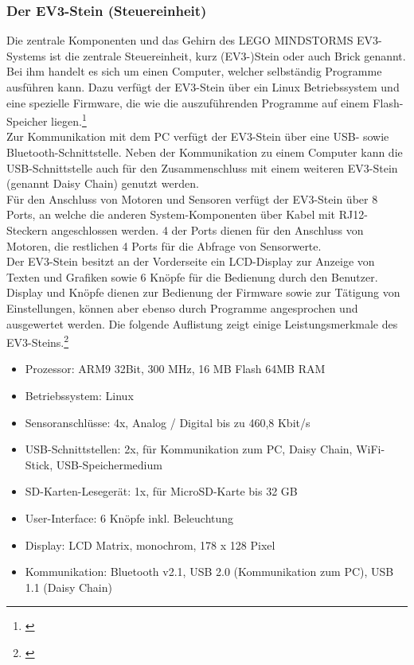 \subsubsection{Der EV3-Stein (Steuereinheit)}
\color{finishing}
Die zentrale Komponenten und das Gehirn des LEGO MINDSTORMS EV3-Systems ist die zentrale Steuereinheit, kurz (EV3-)Stein oder auch Brick genannt. Bei ihm handelt es sich um einen Computer, welcher selbständig Programme ausführen kann. Dazu verfügt der EV3-Stein über ein Linux Betriebssystem und eine spezielle Firmware, die wie die auszuführenden Programme auf einem Flash-Speicher liegen.\footnote{\citep[vgl.][Das EV3 Roboter Universum, Seite 21]{Scholz.DasEV3}\label{note25}} \\
Zur Kommunikation mit dem PC verfügt der EV3-Stein über eine USB- sowie Bluetooth-Schnittstelle. Neben der Kommunikation zu einem Computer kann die USB-Schnittstelle auch für den Zusammenschluss mit einem weiteren EV3-Stein (genannt Daisy Chain) genutzt werden.  \\
Für den Anschluss von Motoren und Sensoren verfügt der EV3-Stein über 8 Ports, an welche die anderen System-Komponenten über Kabel mit RJ12-Steckern angeschlossen werden. 4 der Ports dienen für den Anschluss von
Motoren, die restlichen 4 Ports für die Abfrage von Sensorwerte. \\
Der EV3-Stein besitzt an der Vorderseite ein LCD-Display zur Anzeige von Texten und Grafiken sowie 6 Knöpfe für die Bedienung durch den Benutzer. Display und Knöpfe dienen zur Bedienung der Firmware sowie zur Tätigung von Einstellungen, können aber ebenso durch Programme angesprochen und ausgewertet werden.
\medskip
\newline
Die folgende Auflistung zeigt einige Leistungsmerkmale des EV3-Steins.\footnote{\citep[vgl.][Das EV3 Roboter Universum, Seite 23 f., EV3-Programmieren mit Java, Seite 32]{Scholz.DasEV3, Schobel.RobertaEV3Programmieren}\label{note26}}
\begin{itemize}
	\item{Prozessor:} ARM9 32Bit, 300 MHz, 16 MB Flash 64MB RAM
	\item{Betriebssystem:} Linux
	\item{Sensoranschlüsse:} 4x, Analog / Digital bis zu 460,8 Kbit/s
	\item{USB-Schnittstellen:} 2x, für Kommunikation zum PC, Daisy Chain, WiFi-Stick, USB-Speichermedium
	\item{SD-Karten-Lesegerät:} 1x, für MicroSD-Karte bis 32 GB
	\item{User-Interface:} 6 Knöpfe inkl. Beleuchtung
	\item{Display:} LCD Matrix, monochrom, 178 x 128 Pixel
	\item{Kommunikation:} Bluetooth v2.1, USB 2.0 (Kommunikation zum PC), USB 1.1 (Daisy Chain)
\end{itemize}

